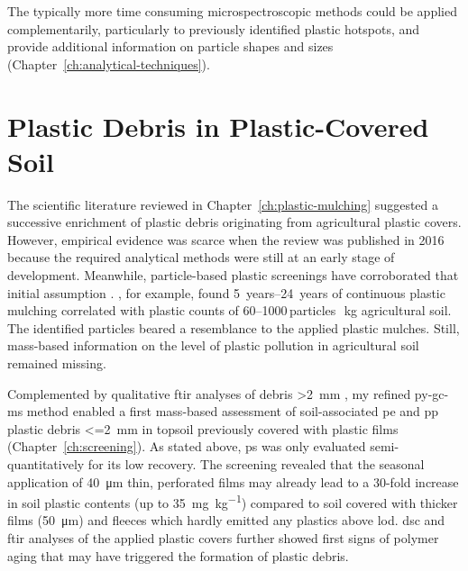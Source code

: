 The typically more time consuming microspectroscopic methods could be applied complementarily, particularly to previously identified plastic hotspots, and provide additional information on particle shapes and sizes (Chapter~\ref{ch:analytical-techniques}).

\section{Plastic Debris in Plastic-Covered Soil}
\label{sec:general-discussion:screening}

The scientific literature reviewed in Chapter~\ref{ch:plastic-mulching} suggested a successive enrichment of plastic debris originating from agricultural plastic covers. However, empirical evidence was scarce when the review was published in 2016 because the required analytical methods were still at an early stage of development. Meanwhile, particle-based plastic screenings have corroborated that initial assumption \citep{HuangAgricultural2020,ZhouMicroplastics2020}. , for example, found \SIrange{5}{24}{years} of continuous plastic mulching correlated with plastic counts of \numrange{60}{1000}\,particles\,\si{\per\kilo\gram} agricultural soil. The identified particles beared a resemblance to the applied plastic mulches.
Still, mass-based information on the level of plastic pollution in agricultural soil remained missing.

Complemented by qualitative \ac{ftir} analyses of debris \SI{>2}{\milli\meter} \citep{CowgerMicroplastic2021}, my refined \ac{py-gc-ms} method enabled a first mass-based assessment of soil-associated \ac{pe} and \ac{pp} plastic debris \SI{<=2}{\milli\meter} in topsoil previously covered with plastic films (Chapter~\ref{ch:screening}). As stated above, \ac{ps} was only evaluated semi-quantitatively for its low recovery.
The screening revealed that the seasonal application of \SI{40}{\micro\meter} thin, perforated films may already lead to a 30-fold increase in soil plastic contents (up to \SI{35}{\milli\gram\per\kilo\gram}) compared to soil covered with thicker films (\SI{50}{\micro\meter}) and fleeces which hardly emitted any plastics above \ac{lod}. \Ac{dsc} and \ac{ftir} analyses of the applied plastic covers further showed first signs of polymer aging that may have triggered the formation of plastic debris.

